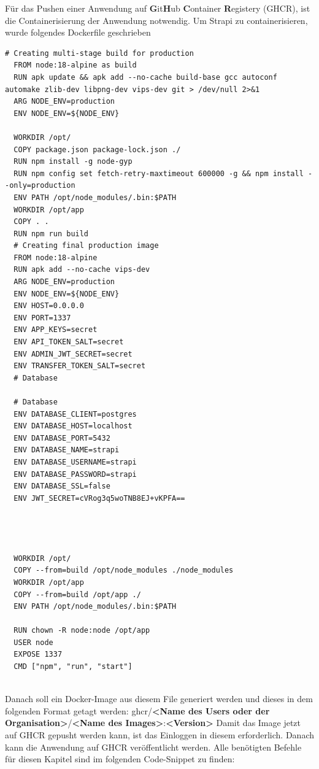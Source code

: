 Für das Pushen einer Anwendung auf \textbf{G}it\textbf{H}ub \textbf{C}ontainer \textbf{R}egistery (GHCR), ist die Containerisierung der Anwendung notwendig.
Um Strapi zu containerisieren, wurde folgendes Dockerfile geschrieben

\begin{lstlisting}[caption=Strapi Dockerfile]
  # Creating multi-stage build for production
  FROM node:18-alpine as build
  RUN apk update && apk add --no-cache build-base gcc autoconf automake zlib-dev libpng-dev vips-dev git > /dev/null 2>&1
  ARG NODE_ENV=production
  ENV NODE_ENV=${NODE_ENV}
  
  WORKDIR /opt/
  COPY package.json package-lock.json ./
  RUN npm install -g node-gyp
  RUN npm config set fetch-retry-maxtimeout 600000 -g && npm install --only=production
  ENV PATH /opt/node_modules/.bin:$PATH
  WORKDIR /opt/app
  COPY . .
  RUN npm run build
  # Creating final production image
  FROM node:18-alpine
  RUN apk add --no-cache vips-dev
  ARG NODE_ENV=production
  ENV NODE_ENV=${NODE_ENV}
  ENV HOST=0.0.0.0
  ENV PORT=1337
  ENV APP_KEYS=secret
  ENV API_TOKEN_SALT=secret
  ENV ADMIN_JWT_SECRET=secret
  ENV TRANSFER_TOKEN_SALT=secret
  # Database
  
  # Database
  ENV DATABASE_CLIENT=postgres
  ENV DATABASE_HOST=localhost
  ENV DATABASE_PORT=5432
  ENV DATABASE_NAME=strapi
  ENV DATABASE_USERNAME=strapi
  ENV DATABASE_PASSWORD=strapi
  ENV DATABASE_SSL=false
  ENV JWT_SECRET=cVRog3q5woTNB8EJ+vKPFA==
  
  
  
  
  WORKDIR /opt/
  COPY --from=build /opt/node_modules ./node_modules
  WORKDIR /opt/app
  COPY --from=build /opt/app ./
  ENV PATH /opt/node_modules/.bin:$PATH
  
  RUN chown -R node:node /opt/app
  USER node
  EXPOSE 1337
  CMD ["npm", "run", "start"]
    
\end{lstlisting}





Danach soll ein Docker-Image aus diesem File generiert werden und dieses in dem folgenden Format getagt werden:
\newline
ghcr/\textbf{<Name des Users oder der Organisation>}/\textbf{<Name des Images>}:\textbf{<Version>}
\newline
Damit das Image jetzt auf GHCR gepusht werden kann, ist das Einloggen in diesem erforderlich.
Danach kann die Anwendung auf GHCR veröffentlicht werden.
Alle benötigten Befehle für diesen Kapitel sind im folgenden Code-Snippet zu finden:

